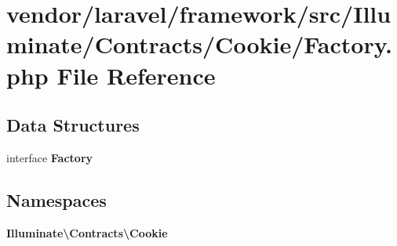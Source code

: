 \section{vendor/laravel/framework/src/\+Illuminate/\+Contracts/\+Cookie/\+Factory.php File Reference}
\label{laravel_2framework_2src_2_illuminate_2_contracts_2_cookie_2_factory_8php}
\subsection*{Data Structures}
\begin{DoxyCompactItemize}
\item 
interface {\bf Factory}
\end{DoxyCompactItemize}
\subsection*{Namespaces}
\begin{DoxyCompactItemize}
\item 
 {\bf Illuminate\textbackslash{}\+Contracts\textbackslash{}\+Cookie}
\end{DoxyCompactItemize}
